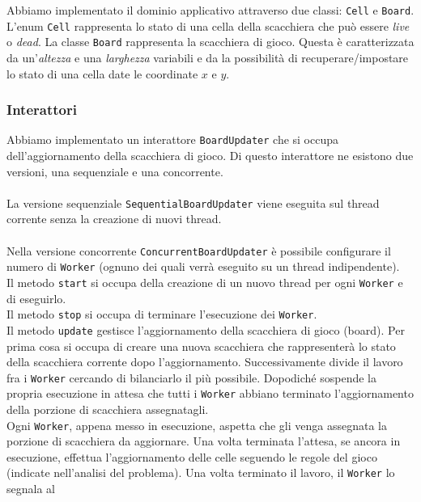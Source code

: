 ﻿\documentclass[a4paper]{article}
\begin{document}
Abbiamo implementato il dominio applicativo attraverso due classi:
\texttt{Cell} e \texttt{Board}.\\
L'enum \texttt{Cell} rappresenta lo stato di una cella della scacchiera che può essere \emph{live} o \emph{dead}.
La classe \texttt{Board} rappresenta la scacchiera di gioco. Questa è
caratterizzata da un'\emph{altezza} e una \emph{larghezza} variabili e da la possibilità di recuperare/impostare lo stato di una cella date le coordinate $x$ e $y$.

\subsubsection{Interattori}\label{interattori}

Abbiamo implementato un interattore \texttt{BoardUpdater} che si occupa dell'aggiornamento della scacchiera di gioco. Di questo interattore ne esistono due versioni, una sequenziale e una concorrente.\\\\
La versione sequenziale \texttt{SequentialBoardUpdater} viene eseguita sul thread corrente senza la creazione di nuovi thread.\\\\
Nella versione concorrente \texttt{ConcurrentBoardUpdater} è possibile configurare il numero di \texttt{Worker} (ognuno dei quali verrà
eseguito su un thread indipendente).\\
Il metodo \texttt{start} si occupa della creazione di un nuovo thread
per ogni \texttt{Worker} e di eseguirlo.\\
Il metodo \texttt{stop} si occupa di terminare l'esecuzione dei
\texttt{Worker}.\\
Il metodo \texttt{update} gestisce l'aggiornamento della scacchiera di gioco (board). Per prima cosa si occupa di creare una nuova scacchiera che rappresenterà lo stato della scacchiera corrente dopo
l'aggiornamento. Successivamente divide il lavoro fra i \texttt{Worker} cercando di bilanciarlo il più possibile. Dopodiché sospende la propria esecuzione in attesa che tutti i \texttt{Worker} abbiano terminato
l'aggiornamento della porzione di scacchiera assegnatagli.\\
Ogni \texttt{Worker}, appena messo in esecuzione, aspetta che gli venga assegnata la porzione di scacchiera da aggiornare. Una volta terminata l'attesa, se ancora in esecuzione, effettua l'aggiornamento delle celle seguendo le regole del gioco (indicate nell'analisi del problema). Una volta terminato il lavoro, il \texttt{Worker} lo segnala al
\end{document}

